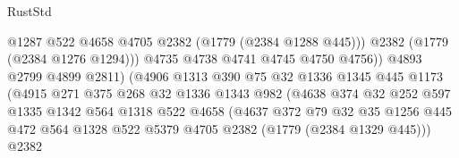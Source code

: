 \begin{lexlean}{RustStd}
\begin{coremodule}
                                        @1287
                                        @522
                                        @4658
                                        @4705
                                        @2382
                                        (@1779 (@2384 @1288 @445)))
                                      @2382
                                      (@1779 (@2384 @1276 @1294)))
                                    @4735
                                    @4738
                                    @4741
                                    @4745
                                    @4750
                                    @4756))
                                @4893
                                @2799
                                @4899
                                @2811)
                              (@4906
                                @1313
                                @390
                                @75
                                @32
                                @1336
                                @1345
                                @445
                                @1173
                                (@4915
                                  @271
                                  @375
                                  @268
                                  @32
                                  @1336
                                  @1343
                                  @982
                                  (@4638
                                    @374
                                    @32
                                    @252
                                    @597
                                    @1335
                                    @1342
                                    @564
                                    @1318
                                    @522
                                    @4658
                                    (@4637
                                      @372
                                      @79
                                      @32
                                      @35
                                      @1256
                                      @445
                                      @472
                                      @564
                                      @1328
                                      @522
                                      @5379
                                      @4705
                                      @2382
                                      (@1779 (@2384 @1329 @445)))
                                    @2382

\end{coremodule}
\end{lexlean}

